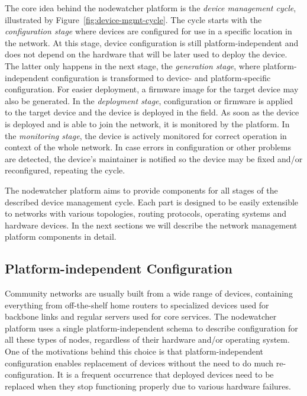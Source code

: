 \documentclass[5p,sort&compress]{elsarticle}
\begin{document}

The core idea behind the nodewatcher platform is the \textit{device management cycle}, illustrated by Figure~\ref{fig:device-mgmt-cycle}. The cycle starts with the \textit{configuration stage} where devices are configured for use in a specific location in the network. At this stage, device configuration is still platform-independent and does not depend on the hardware that will be later used to deploy the device. The latter only happens in the next stage, the \textit{generation stage}, where platform-independent configuration is transformed to device- and platform-specific configuration. For easier deployment, a firmware image for the target device may also be generated. In the \textit{deployment stage}, configuration or firmware is applied to the target device and the device is deployed in the field. As soon as the device is deployed and is able to join the network, it is monitored by the platform. In the \textit{monitoring stage}, the device is actively monitored for correct operation in context of the whole network. In case errors in configuration or other problems are detected, the device's maintainer is notified so the device may be fixed and/or reconfigured, repeating the cycle.

The nodewatcher platform aims to provide components for all stages of the described device management cycle. Each part is designed to be easily extensible to networks with various topologies, routing protocols, operating systems and hardware devices. In the next sections we will describe the network management platform components in detail.

\subsection{Platform-independent Configuration}

Community networks are usually built from a wide range of devices, containing everything from off-the-shelf home routers to specialized devices used for backbone links and regular servers used for core services. The nodewatcher platform uses a single platform-independent schema to describe configuration for all these types of nodes, regardless of their hardware and/or operating system. One of the motivations behind this choice is that platform-independent configuration enables replacement of devices without the need to do much re-configuration. It is a frequent occurrence that deployed devices need to be replaced when they stop functioning properly due to various hardware failures.
\end{document}
